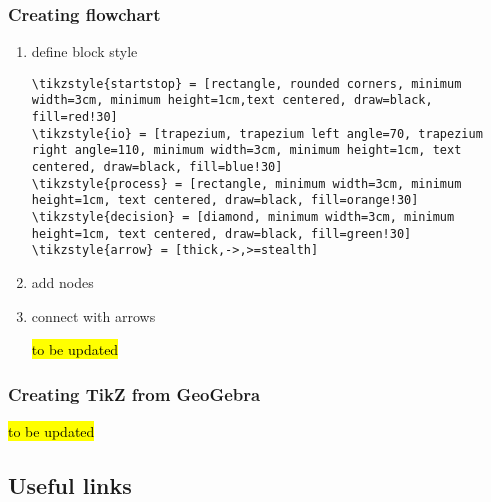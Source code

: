 \subsubsection{Creating flowchart}
\label{subsub:flowchart}

\begin{enumerate}
    \item define block style
    
\begin{lstlisting}[language=Tex]
\tikzstyle{startstop} = [rectangle, rounded corners, minimum width=3cm, minimum height=1cm,text centered, draw=black, fill=red!30]
\tikzstyle{io} = [trapezium, trapezium left angle=70, trapezium right angle=110, minimum width=3cm, minimum height=1cm, text centered, draw=black, fill=blue!30]
\tikzstyle{process} = [rectangle, minimum width=3cm, minimum height=1cm, text centered, draw=black, fill=orange!30]
\tikzstyle{decision} = [diamond, minimum width=3cm, minimum height=1cm, text centered, draw=black, fill=green!30]
\tikzstyle{arrow} = [thick,->,>=stealth]
\end{lstlisting}

\item add nodes


\item connect with arrows

\hl{to be updated}

\end{enumerate}

\subsubsection{Creating TikZ from GeoGebra}

\hl{to be updated}


\subsection{Useful links}

